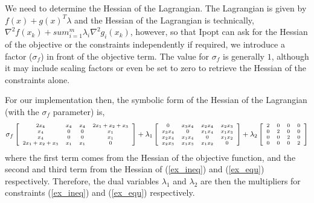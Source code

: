 \documentclass[letter,10pt]{article}
\begin{document}
{We need to determine the Hessian of the Lagrangian.  The Lagrangian is
given by $f(x) + g(x)^T \lambda$ and the Hessian of the Lagrangian is
technically, $ \nabla^2 f(x_k) + sum_{i=1}^m\lambda_i\nabla^2 g_i(x_k)$,
however, so that Ipopt can ask for the Hessian of the objective or the
constraints independently if required, we introduce a factor
($\sigma_f$) in front of the objective term. The value for $\sigma_f$
is generally $1$, although it may include scaling factors or even be
set to zero to retrieve the Hessian of the constraints alone.

For our implementation then, the symbolic form of the Hessian of the
Lagrangian (with the $\sigma_f$ parameter) is,
\begin{equation}
\scriptsize
\sigma_f \left[
\begin{array}{cccc}
2 x_4           & x_4           & x_4           & 2 x_1 + x_2 + x_3     \\
x_4             & 0             & 0             & x_1                   \\
x_4             & 0             & 0             & x_1                   \\
2 x_1+x_2+x_3   & x_1           & x_1           & 0
\end{array}
\right]
+
\lambda_1
\left[
\begin{array}{cccc}
0               & x_3 x_4       & x_2 x_4       & x_2 x_3       \\
x_3 x_4         & 0             & x_1 x_4       & x_1 x_3       \\
x_2 x_4         & x_1 x_4       & 0             & x_1 x_2       \\
x_2 x_3         & x_1 x_3       & x_1 x_2       & 0 
\end{array}
\right]
+
\lambda_2
\left[
\begin{array}{cccc}
2       & 0     & 0     & 0     \\
0       & 2     & 0     & 0     \\
0       & 0     & 2     & 0     \\
0       & 0     & 0     & 2
\end{array}
\right]
\end{equation}
where the first term comes from the Hessian of the objective function, and the 
second and third term from the Hessian of (\ref{ex_ineq}) and (\ref{ex_equ})
respectively. Therefore, the dual variables $\lambda_1$ and $\lambda_2$ 
are then the multipliers for constraints (\ref{ex_ineq}) and (\ref{ex_equ})
respectively.

}
\end{document}
